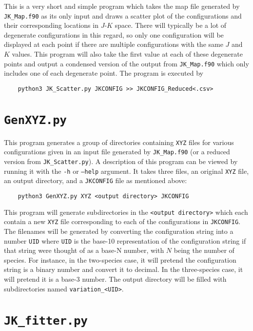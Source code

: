 \documentclass[12pt]{article}
\begin{document}
This is a very short and simple program which takes the map file generated by \texttt{JK\_Map.f90} as its only input and draws a scatter plot of the configurations and their corresponding locations in $ J $-$ K $ space. There will typically be a lot of degenerate configurations in this regard, so only one configuration will be displayed at each point if there are multiple configurations with the same $ J $ and $ K $ values. This program will also take the first value at each of these degenerate points and output a condensed version of the output from \texttt{JK\_Map.f90} which only includes one of each degenerate point. The program is executed by
\begin{verbatim}
    python3 JK_Scatter.py JKCONFIG >> JKCONFIG_Reduced<.csv>
\end{verbatim}

\section{\texttt{GenXYZ.py}}

This program generates a group of directories containing \texttt{XYZ} files for various configurations given in an input file generated by \texttt{JK\_Map.f90} (or a reduced version from \texttt{JK\_Scatter.py}). A description of this program can be viewed by running it with the \texttt{-h} or \texttt{--help} argument. It takes three files, an original \texttt{XYZ} file, an output directory, and a \texttt{JKCONFIG} file as mentioned above:
\begin{verbatim}
    python3 GenXYZ.py XYZ <output directory> JKCONFIG
\end{verbatim}

This program will generate subdirectories in the \texttt{<output directory>} which each contain a new \texttt{XYZ} file corresponding to each of the configurations in \texttt{JKCONFIG}. The filenames will be generated by converting the configuration string into a number \texttt{UID} where \texttt{UID} is the base-10 representation of the configuration string if that string were thought of as a base-N number, with $ N $ being the number of species. For instance, in the two-species case, it will pretend the configuration string is a binary number and convert it to decimal. In the three-species case, it will pretend it is a base-3 number. The output directory will be filled with subdirectories named \texttt{variation\_<UID>}.

\section{\texttt{JK\_fitter.py}}
\end{document}
